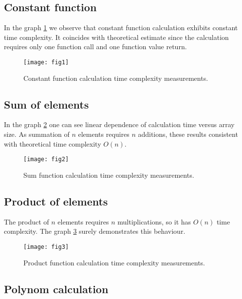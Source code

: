 \documentclass[12pt, bachelor, substylefile = algo_title.rtx]{disser}
\theoremstyle{definition}
\begin{document}
\subsection{Constant function}

In the graph \ref{fig: 1} we observe that constant function calculation exhibits constant time complexity. It coincides with theoretical estimate since the calculation requires only one function call and one function value return. 

\begin{figure}[h]
\begin{center}
\texttt{[image: fig1]}
\caption{Constant function calculation time complexity measurements.}
\label{fig: 1}
\end{center}
\end{figure}

\subsection{Sum of elements}

In the graph \ref{fig: 2} one can see linear dependence of calculation time versus array size. As summation of $n$ elements requires $n$ additions, these results consistent with theoretical time complexity $O(n)$.

\begin{figure}[h]
\begin{center}
\texttt{[image: fig2]}
\caption{Sum function calculation time complexity measurements.}
\label{fig: 2}
\end{center}
\end{figure}

\subsection{Product of elements}

The product of $n$ elements requires $n$ multiplications, so it has $O(n)$ time complexity. The graph \ref{fig: 3} surely demonstrates this behaviour.

\begin{figure}[h]
\begin{center}
\texttt{[image: fig3]}
\caption{Product function calculation time complexity measurements.}
\label{fig: 3}
\end{center}
\end{figure}

\subsection{Polynom calculation}
\end{document}
